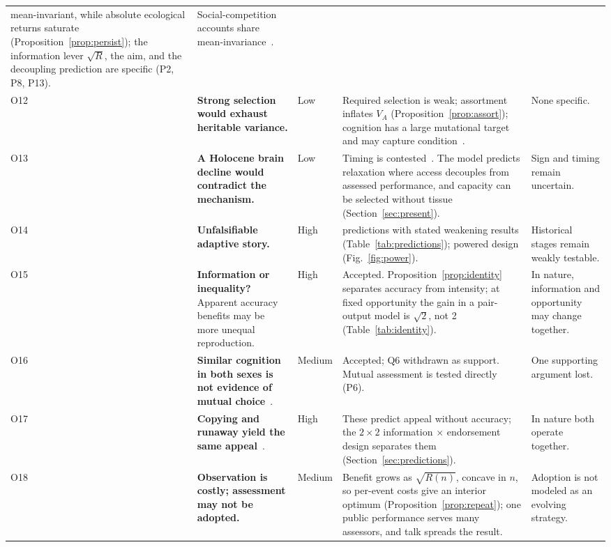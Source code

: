 \begin{table}[tp]
\begin{tabularx}{\textwidth}{@{}P{0.028\textwidth}P{0.225\textwidth}P{0.05\textwidth}LP{0.19\textwidth}@{}}
mean-invariant, while absolute ecological returns saturate (Proposition~\ref{prop:persist}); the information lever $\sqrt{R}$,
the aim, and the decoupling prediction are specific (P2, P8, P13). & Social-competition accounts share
mean-invariance~\cite{flinn2005,crespi2022}.\\
O12 & \textbf{Strong selection would exhaust heritable variance.} & Low & Required selection is weak; assortment inflates
$V_A$ (Proposition~\ref{prop:assort}); cognition has a large mutational target and may capture
condition~\cite{rowe1996,keller2006,millerpenke2007}. & None specific.\\
O13 & \textbf{A Holocene brain decline would contradict the mechanism.} & Low & Timing is contested~\cite{desilva2021,villmoare2022}.
The model predicts relaxation where access decouples from assessed performance, and capacity can be selected without tissue
(Section~\ref{sec:present}). & Sign and timing remain uncertain.\\
O14 & \textbf{Unfalsifiable adaptive story.} & High & \NPred{} predictions with stated weakening results
(Table~\ref{tab:predictions}); powered design (Fig.~\ref{fig:power}). & Historical stages remain weakly testable.\\
O15 & \textbf{Information or inequality?} Apparent accuracy benefits may be more unequal reproduction. & High & Accepted.
Proposition~\ref{prop:identity} separates accuracy from intensity; at fixed opportunity the gain in a pair-output model is $\sqrt2$, not 2
(Table~\ref{tab:identity}). & In nature, information and opportunity may change together.\\
O16 & \textbf{Similar cognition in both sexes is not evidence of mutual choice}~\cite{lande1980}. & Medium & Accepted; Q6
withdrawn as support. Mutual assessment is tested directly (P6). & One supporting argument lost.\\
O17 & \textbf{Copying and runaway yield the same appeal}~\cite{duval2023,lande1981,gouda2018}. & High & These predict appeal
without accuracy; the $2\times2$ information $\times$ endorsement design separates them (Section~\ref{sec:predictions}). & In
nature both operate together.\\
O18 & \textbf{Observation is costly; assessment may not be adopted.} & Medium & Benefit grows as $\sqrt{R(n)}$, concave in
$n$, so per-event costs give an interior optimum (Proposition~\ref{prop:repeat}); one public performance serves many
assessors, and talk spreads the result. & Adoption is not modeled as an evolving strategy.\\
\bottomrule
\end{tabularx}
\end{table}

